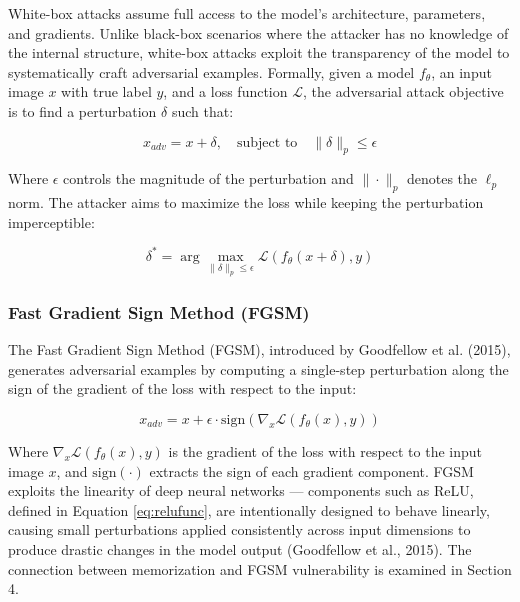 
White-box attacks assume full access to the model's 
architecture, parameters, and gradients. Unlike black-box 
scenarios where the attacker has no knowledge of the 
internal structure, white-box attacks exploit the 
transparency of the model to systematically craft 
adversarial examples. Formally, given a model $f_\theta$, 
an input image $x$ with true label $y$, and a loss 
function $\mathcal{L}$, the adversarial attack objective 
is to find a perturbation $\delta$ such that:

\begin{equation}
x_{adv} = x + \delta, \quad 
\text{subject to} \quad \|\delta\|_p \leq \epsilon
\label{eq:advobj}
\end{equation}

Where $\epsilon$ controls the magnitude of the 
perturbation and $\|\cdot\|_p$ denotes the $\ell_p$ norm. 
The attacker aims to maximize the loss while keeping 
the perturbation imperceptible:

\begin{equation}
\delta^* = \arg\max_{\|\delta\|_p \leq \epsilon} 
\mathcal{L}(f_\theta(x + \delta), y)
\label{eq:advmax}
\end{equation}

\subsubsection{Fast Gradient Sign Method (FGSM)}

The Fast Gradient Sign Method (FGSM), introduced by 
Goodfellow et al. (2015), generates adversarial examples 
by computing a single-step perturbation along the sign 
of the gradient of the loss with respect to the input:

\begin{equation}
x_{adv} = x + \epsilon \cdot 
\text{sign}\left(\nabla_x 
\mathcal{L}(f_\theta(x), y)\right)
\label{eq:fgsm}
\end{equation}

Where $\nabla_x \mathcal{L}(f_\theta(x), y)$ is the 
gradient of the loss with respect to the input image 
$x$, and $\text{sign}(\cdot)$ extracts the sign of 
each gradient component. FGSM exploits the linearity 
of deep neural networks — components such as ReLU, 
defined in Equation \ref{eq:relufunc}, are intentionally 
designed to behave linearly, causing small perturbations 
applied consistently across input dimensions to produce 
drastic changes in the model output (Goodfellow et al., 
2015). The connection between memorization and FGSM 
vulnerability is examined in Section 4.

